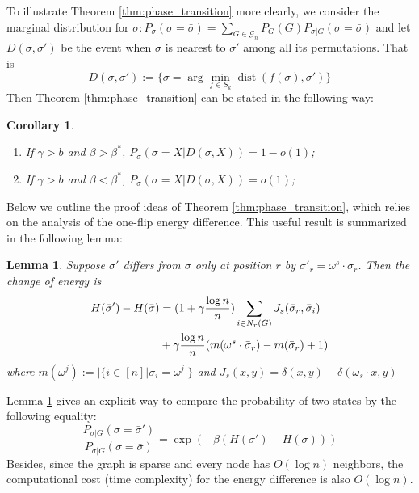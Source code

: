 \documentclass[journal]{IEEEtran}
\newtheorem{corollary}{Corollary}
\newtheorem{lemma}{Lemma}
\newcommand{\cG}{\mathcal{G}}
\newcommand{\1}{\mathbbm{1}}
\DeclareMathOperator{\dist}{dist}
\begin{document}
To illustrate Theorem
\ref{thm:phase_transition} more clearly, we consider the marginal distribution for $\sigma: P_{\sigma}(\sigma =\bar{\sigma})
=\sum_{G \in \cG_n}P_G(G)P_{\sigma |G}(\sigma=\bar{\sigma})$
and
let $D(\sigma, \sigma')$ be the event when $\sigma$ is nearest to $\sigma'$ among all its permutations.
That is
\begin{equation}
D(\sigma, \sigma') := \{ \sigma = \arg\min_{f \in S_k} \dist(f(\sigma), \sigma')  \}
\end{equation}
Then Theorem \ref{thm:phase_transition} can be stated in the following way:
\begin{corollary}\label{cor:phase4}
\begin{enumerate}
	\item If $\gamma > b$ and $\beta > \beta^*$, $P_{\sigma}(\sigma = X | D(\sigma, X))  = 1-o(1)$;
	\item If $\gamma > b$ and $\beta < \beta^*$, $P_{\sigma}(\sigma = X | D(\sigma, X))  = o(1)$;
\end{enumerate}	
\end{corollary}

Below we outline the proof ideas of Theorem \ref{thm:phase_transition}, which relies on the analysis of the one-flip energy difference.
This useful result is summarized in the following lemma:
\begin{lemma}\label{lem:lemmaDiff}
	Suppose $\bar{\sigma}'$ differs from $\bar{\sigma}$ only at position $r$ by $\bar{\sigma}'_r = \omega^s \cdot \bar{\sigma}_r$.
	Then the change of energy is
	\begin{align}
	H(\bar{\sigma}') - H(\bar{\sigma}) &= (1+\gamma \frac{\log n}{n})\sum_{i \in N_r(G)} J_s(\bar{\sigma}_r, \bar{\sigma}_i)
	\notag \\
	&+ \gamma \frac{\log n}{n} (m(\omega^s \cdot \bar{\sigma}_r)-m(\bar{\sigma}_r)+1) \label{eq:DeltaH}
	\end{align}
	where $m(\omega^j) := |\{i \in [n] | \bar{\sigma}_i = \omega^j | \}$ and $J_s(x, y) = \delta(x, y) - \delta(\omega_s \cdot x, y)$
\end{lemma}
Lemma \ref{lem:lemmaDiff} gives an explicit way to compare the probability of two states by the following
equality:
\begin{equation}\label{eq:Pratio}
\frac{P_{\sigma |G } (\sigma = \bar{\sigma}')}{P_{\sigma |G } (\sigma = \bar{\sigma})}
= \exp(-\beta(H(\bar{\sigma}') - H(\bar{\sigma})))
\end{equation}
Besides, since the graph is sparse and every node has $O(\log n)$ neighbors, the computational cost (time complexity) for the energy difference
is also $O(\log n)$. 
\end{document}
